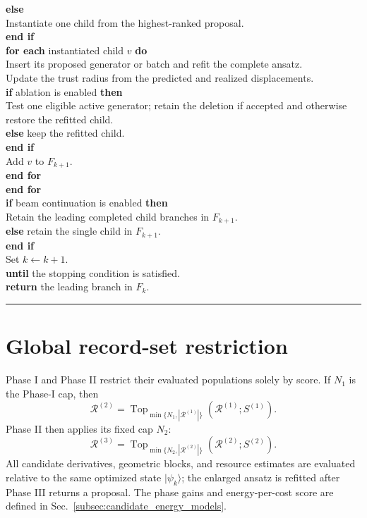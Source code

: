 \documentclass[
  reprint,
  amsmath,
  amssymb,
  aps,
  pra,
  nofootinbib,
  superscriptaddress,
  floatfix
]{revtex4-2}
\newcommand{\ket}[1]{|#1\rangle}
\begin{document}
\begin{widetext}
\begin{tabbing}
\>\>\textbf{else}\\
\>\>\>Instantiate one child from the highest-ranked proposal.\\
\>\>\textbf{end if}\\
\>\>\textbf{for each} instantiated child \(v\) \textbf{do}\\
\>\>\>Insert its proposed generator or batch and refit the complete ansatz.\\
\>\>\>Update the trust radius from the predicted and realized displacements.\\
\>\>\>\textbf{if} ablation is enabled \textbf{then}\\
\>\>\>\>Test one eligible active generator; retain the deletion if accepted and otherwise restore the refitted child.\\
\>\>\>\textbf{else} keep the refitted child.\\
\>\>\>\textbf{end if}\\
\>\>\>Add \(v\) to \(F_{k+1}\).\\
\>\>\textbf{end for}\\
\>\textbf{end for}\\
\>\textbf{if} beam continuation is enabled \textbf{then}\\
\>\>Retain the leading completed child branches in \(F_{k+1}\).\\
\>\textbf{else} retain the single child in \(F_{k+1}\).\\
\>\textbf{end if}\\
\>Set \(k\leftarrow k+1\).\\
\textbf{until} the stopping condition is satisfied.\\
\textbf{return} the leading branch in \(F_k\).
\end{tabbing}
\noindent\rule{\textwidth}{0.4pt}
\end{widetext}

\section{Global record-set restriction}
\label{app:record_restriction}

Phase I and Phase II restrict their evaluated populations solely by score. If
\(N_1\) is the Phase-I cap, then
\begin{equation}
\mathcal R^{(2)}
=\operatorname{Top}_{\min\{N_1,|\mathcal R^{(1)}|\}}
\left(\mathcal R^{(1)};S^{(1)}\right).
\label{eq:phase_restriction_map}
\end{equation}
Phase II then applies its fixed cap \(N_2\):
\begin{equation}
\mathcal R^{(3)}
=\operatorname{Top}_{\min\{N_2,|\mathcal R^{(2)}|\}}
\left(\mathcal R^{(2)};S^{(2)}\right).
\label{eq:phase2_restriction_map}
\end{equation}
All candidate derivatives, geometric blocks, and resource estimates are
evaluated relative to the same optimized state \(\ket{\psi_k}\); the enlarged
ansatz is refitted after Phase III returns a proposal. The phase gains and
energy-per-cost score are defined in
Sec.~\ref{subsec:candidate_energy_models}.
\end{document}
